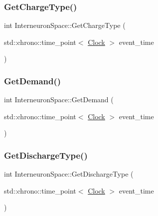 \mbox{\label{classInterneuronSpace_a90a2c950dd426ed3f015e3c186e877fd}} 
\subsubsection{\texorpdfstring{Get\+Charge\+Type()}{GetChargeType()}}
{\footnotesize\ttfamily int Interneuron\+Space\+::\+Get\+Charge\+Type (\begin{DoxyParamCaption}\item[{std\+::chrono\+::time\+\_\+point$<$ \mbox{\hyperlink{universe_8h_a0ef8d951d1ca5ab3cfaf7ab4c7a6fd80}{Clock}} $>$}]{event\+\_\+time }\end{DoxyParamCaption})\hspace{0.3cm}{\ttfamily [inline]}}

\mbox{\label{classInterneuronSpace_ae62237c3a84893c81e9998602ab16718}} 
\subsubsection{\texorpdfstring{Get\+Demand()}{GetDemand()}}
{\footnotesize\ttfamily int Interneuron\+Space\+::\+Get\+Demand (\begin{DoxyParamCaption}\item[{std\+::chrono\+::time\+\_\+point$<$ \mbox{\hyperlink{universe_8h_a0ef8d951d1ca5ab3cfaf7ab4c7a6fd80}{Clock}} $>$}]{event\+\_\+time }\end{DoxyParamCaption})}

\mbox{\label{classInterneuronSpace_ae65bf091b84fa11459ef754ed1c7bf21}} 
\subsubsection{\texorpdfstring{Get\+Discharge\+Type()}{GetDischargeType()}}
{\footnotesize\ttfamily int Interneuron\+Space\+::\+Get\+Discharge\+Type (\begin{DoxyParamCaption}\item[{std\+::chrono\+::time\+\_\+point$<$ \mbox{\hyperlink{universe_8h_a0ef8d951d1ca5ab3cfaf7ab4c7a6fd80}{Clock}} $>$}]{event\+\_\+time }\end{DoxyParamCaption})\hspace{0.3cm}{\ttfamily [inline]}}

